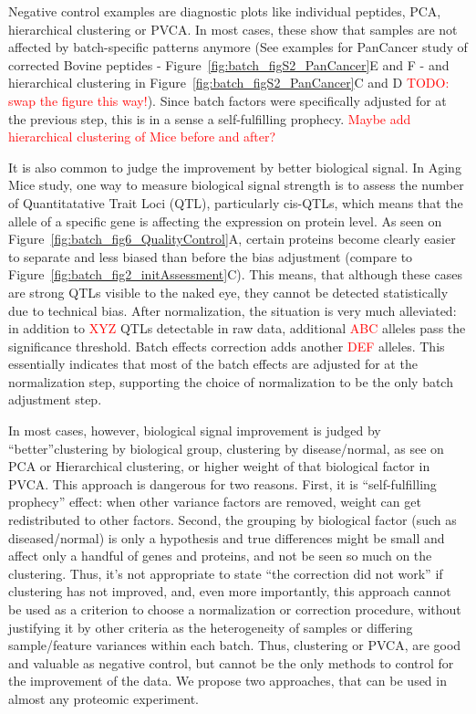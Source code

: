 \documentclass[num-refs]{wiley-article}
\begin{document}
Negative control examples are diagnostic plots like individual peptides, PCA, hierarchical clustering or PVCA. In most cases, these show that samples are not affected by batch-specific patterns anymore (See examples for PanCancer study of corrected Bovine peptides - Figure~\ref{fig:batch_figS2_PanCancer}E and F -  and hierarchical clustering  in Figure~\ref{fig:batch_figS2_PanCancer}C and D \textcolor{red}{TODO: swap the figure this way!}). Since batch factors were specifically adjusted for at the previous step, this is in a sense a self-fulfilling prophecy. \textcolor{red}{Maybe add hierarchical clustering of Mice before and after?}

It is also common to judge the improvement by better biological signal.  In Aging Mice study, one way to measure biological signal strength is to assess the number of Quantitatative Trait Loci (QTL), particularly cis-QTLs, which means that the allele of a specific gene is affecting the expression on protein level. As seen on Figure~\ref{fig:batch_fig6_QualityControl}A, certain proteins become clearly easier to separate and less biased than before the bias adjustment (compare to Figure~\ref{fig:batch_fig2_initAssessment}C). This means, that although these cases are strong QTLs visible to the naked eye, they cannot be detected statistically due to technical bias. After normalization, the situation is very much alleviated: in addition to \textcolor{red}{XYZ} QTLs detectable in raw data, additional \textcolor{red}{ABC} alleles pass the significance threshold. Batch effects correction adds another \textcolor{red}{DEF} alleles. This essentially indicates that most of the batch effects are adjusted for at the normalization step, supporting the choice of normalization to be the only batch adjustment step.

In most cases, however, biological signal improvement is judged by “better”clustering by biological group, clustering by disease/normal, as see on PCA or Hierarchical clustering, or higher weight of that biological factor in PVCA. This approach is dangerous for two reasons. First, it is “self-fulfilling prophecy” effect: when other variance factors are removed, weight can get redistributed to other factors. Second, the grouping by biological factor (such as diseased/normal) is only a hypothesis and true differences might be small and affect only a handful of genes and proteins, and not be seen so much on the clustering. Thus, it’s not appropriate to state “the correction did not work” if clustering has not improved, and, even more importantly, this approach cannot be used as a criterion to choose a normalization or correction procedure, without justifying it by other criteria as the heterogeneity of samples or differing sample/feature variances within each batch.
Thus, clustering or PVCA, are good and valuable as negative control, but cannot be the only methods to control for the improvement of the data. We propose two approaches, that can be used in almost any proteomic experiment.
\end{document}
